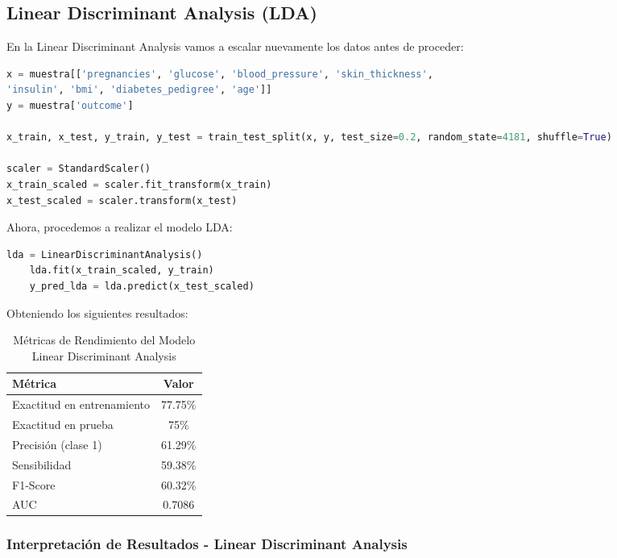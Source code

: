 \documentclass[12pt,a4paper]{article}
\begin{document}
\vspace{1cm}

\subsection{Linear Discriminant Analysis (LDA)}

En la Linear Discriminant Analysis vamos a escalar nuevamente los datos antes de proceder: 

\begin{lstlisting}[language=Python, frame=single, basicstyle=\ttfamily\small, breaklines=true]
    x = muestra[['pregnancies', 'glucose', 'blood_pressure', 'skin_thickness',
'insulin', 'bmi', 'diabetes_pedigree', 'age']]
y = muestra['outcome']

x_train, x_test, y_train, y_test = train_test_split(x, y, test_size=0.2, random_state=4181, shuffle=True)

scaler = StandardScaler()
x_train_scaled = scaler.fit_transform(x_train)
x_test_scaled = scaler.transform(x_test)
\end{lstlisting}

Ahora, procedemos a realizar el modelo LDA:

\begin{lstlisting}[language=Python, frame=single, basicstyle=\ttfamily\small, breaklines=true]
    lda = LinearDiscriminantAnalysis()
    lda.fit(x_train_scaled, y_train)
    y_pred_lda = lda.predict(x_test_scaled)
\end{lstlisting}

Obteniendo los siguientes resultados:

\begin{table}[H]
\centering
\caption{Métricas de Rendimiento del Modelo Linear Discriminant Analysis}\label{tab:lda_resultados}
\begin{tabular}{lc}
\toprule
\textbf{Métrica} & \textbf{Valor} \\
\midrule
Exactitud en entrenamiento & 77.75\% \\
Exactitud en prueba & 75\% \\
Precisión (clase 1) & 61.29\% \\
Sensibilidad & 59.38\% \\
F1-Score & 60.32\% \\
AUC & 0.7086 \\
\bottomrule
\end{tabular}
\end{table}

\subsubsection{Interpretación de Resultados - Linear Discriminant Analysis}
\end{document}
